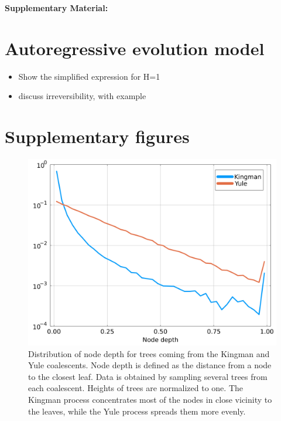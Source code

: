 \begin{center}
\textbf{\large Supplementary Material: \papertitle}
\end{center}

\section{Autoregressive evolution model} %
\label{sec:autoregressive_evolution_model}

\begin{itemize}
	\item Show the simplified expression for H=1
	\item discuss irreversibility, with example
\end{itemize}


\section{Supplementary figures} %
\label{sec:supplementary_figures}

\begin{figure}
	\centering
	\includegraphics[width=.75\textwidth]{figures/SI/depth_distribution_coalescents.png}
	\caption{
		Distribution of node depth for trees coming from the Kingman and Yule coalescents. 
		Node depth is defined as the distance from a node to the closest leaf. 
		Data is obtained by sampling several trees from each coalescent. 
		Heights of trees are normalized to one. 
		The Kingman process concentrates most of the nodes in close vicinity to the leaves, while the Yule process spreads them more evenly. 
	}
	\label{sfig:depth_distribution_coalescent}
\end{figure}

